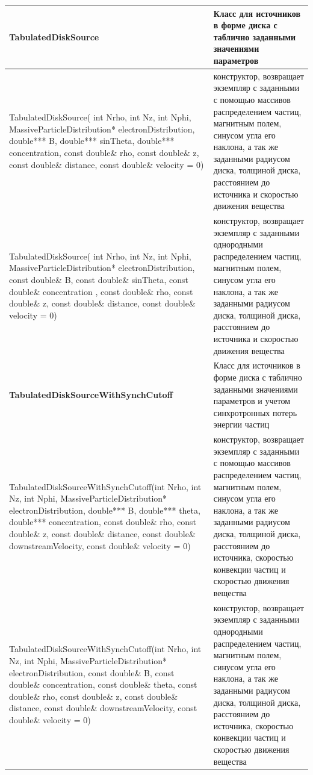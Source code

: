 \begin{small}
\begin{xtabular}{|p{0.5\textwidth}|p{0.5\textwidth}|}
		\hline
		\textbf{TabulatedDiskSource} & Класс для источников в форме диска с таблично заданными значениями параметров\\
		\hline
		TabulatedDiskSource( int Nrho, int Nz, int Nphi, MassiveParticleDistribution* electronDistribution, double*** B, double*** sinTheta, double*** concentration, const double\& rho, const double\& z, const double\& distance, const double\& velocity = 0) & конструктор, возвращает экземпляр с заданными с помощью массивов распределением частиц, магнитным полем, синусом угла его наклона, а так же заданными радиусом диска, толщиной диска, расстоянием до источника и скоростью движения вещества\\
		\hline
		TabulatedDiskSource( int Nrho, int Nz, int Nphi, MassiveParticleDistribution* electronDistribution, const double\& B, const double\& sinTheta, const double\& concentration , const double\& rho, const double\& z, const double\& distance, const double\& velocity = 0) & конструктор, возвращает экземпляр с заданными однородными распределением частиц, магнитным полем, синусом угла его наклона, а так же заданными радиусом диска, толщиной диска, расстоянием до источника и скоростью движения вещества\\
		\hline
		\textbf{TabulatedDiskSourceWithSynchCutoff} & Класс для источников в форме диска с таблично заданными значениями параметров и учетом синхротронных потерь энергии частиц\\
		\hline
		TabulatedDiskSourceWithSynchCutoff(int Nrho, int Nz, int Nphi, MassiveParticleDistribution* electronDistribution, double*** B, double*** theta, double*** concentration, const double\& rho, const double\& z, const double\& distance, const double\& downstreamVelocity, const double\& velocity = 0) &
		конструктор, возвращает экземпляр с заданными с помощью массивов распределением частиц, магнитным полем, синусом угла его наклона, а так же заданными радиусом диска, толщиной диска, расстоянием до источника, скоростью конвекции частиц и скоростью движения вещества\\
		\hline
		TabulatedDiskSourceWithSynchCutoff(int Nrho, int Nz, int Nphi, MassiveParticleDistribution* electronDistribution, const double\& B, const double\& concentration, const double\& theta, const double\& rho, const double\& z, const double\& distance, const double\& downstreamVelocity, const double\& velocity = 0) & конструктор, возвращает экземпляр с заданными однородными распределением частиц, магнитным полем, синусом угла его наклона, а так же заданными радиусом диска, толщиной диска, расстоянием до источника, скоростью конвекции частиц и скоростью движения вещества\\

\end{xtabular}
\end{small}
